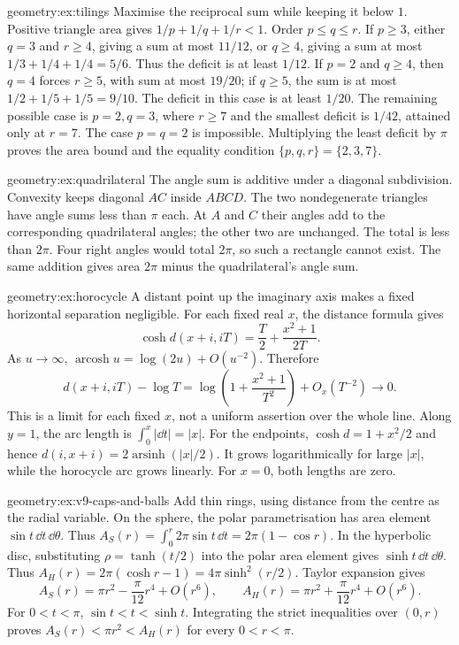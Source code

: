 \begin{solution}{geometry:ex:tilings}
\idea Maximise the reciprocal sum while keeping it below $1$.
\writeup Positive triangle area gives $1/p+1/q+1/r<1$.
Order $p\le q\le r$. If $p\ge3$, either $q=3$ and $r\ge4$,
giving a sum at most $11/12$, or $q\ge4$, giving a sum at most
$1/3+1/4+1/4=5/6$. Thus the deficit is at least $1/12$.
If $p=2$ and $q\ge4$, then $q=4$ forces $r\ge5$, with sum at most
$19/20$; if $q\ge5$, the sum is at most $1/2+1/5+1/5=9/10$.
The deficit in this case is at least $1/20$.
The remaining possible case is $p=2,q=3$, where $r\ge7$ and the
smallest deficit is $1/42$, attained only at $r=7$.
The case $p=q=2$ is impossible. Multiplying the least deficit by $\pi$
proves the area bound and the equality condition $\{p,q,r\}=\{2,3,7\}$.
\end{solution}
\begin{solution}{geometry:ex:quadrilateral}
\idea The angle sum is additive under a diagonal subdivision.
\writeup Convexity keeps diagonal $AC$ inside $ABCD$.
The two nondegenerate triangles have angle sums less than $\pi$ each.
At $A$ and $C$ their angles add to the corresponding quadrilateral
angles; the other two are unchanged. The total is less than $2\pi$.
Four right angles would total $2\pi$, so such a rectangle cannot exist.
The same addition gives area $2\pi$ minus the quadrilateral's angle sum.
\end{solution}
\begin{solution}{geometry:ex:horocycle}
\idea A distant point up the imaginary axis makes a fixed horizontal
separation negligible.
\writeup For each fixed real $x$, the distance formula gives
\[
 \cosh d(x+i,iT)=\frac T2+\frac{x^2+1}{2T}.
\]
As $u\to\infty$, $\operatorname{arcosh}u=\log(2u)+O(u^{-2})$.
Therefore
\[
 d(x+i,iT)-\log T
 =\log\left(1+\frac{x^2+1}{T^2}\right)+O_x(T^{-2})\to0.
\]
This is a limit for each fixed $x$, not a uniform assertion over the
whole line. Along $y=1$, the arc length is $\int_0^x|\dd t|=|x|$.
For the endpoints, $\cosh d=1+x^2/2$ and hence
$d(i,x+i)=2\operatorname{arsinh}(|x|/2)$.
It grows logarithmically for large $|x|$, while the horocycle arc grows
linearly. For $x=0$, both lengths are zero.
\end{solution}
\begin{solution}{geometry:ex:v9-caps-and-balls}
\idea Add thin rings, using distance from the centre as the radial variable.
\writeup On the sphere, the polar parametrisation has area element
$\sin t\,\dd t\,\dd\theta$. Thus
$A_S(r)=\int_0^r2\pi\sin t\,\dd t=2\pi(1-\cos r)$.
In the hyperbolic disc, substituting $\rho=\tanh(t/2)$ into the polar
area element gives $\sinh t\,\dd t\,\dd\theta$. Thus
$A_H(r)=2\pi(\cosh r-1)=4\pi\sinh^2(r/2)$.
Taylor expansion gives
\[
 A_S(r)=\pi r^2-\frac\pi{12}r^4+O(r^6),\qquad
 A_H(r)=\pi r^2+\frac\pi{12}r^4+O(r^6).
\]
For $0<t<\pi$, $\sin t<t<\sinh t$.
Integrating the strict inequalities over $(0,r)$ proves
$A_S(r)<\pi r^2<A_H(r)$ for every $0<r<\pi$.
\end{solution}

